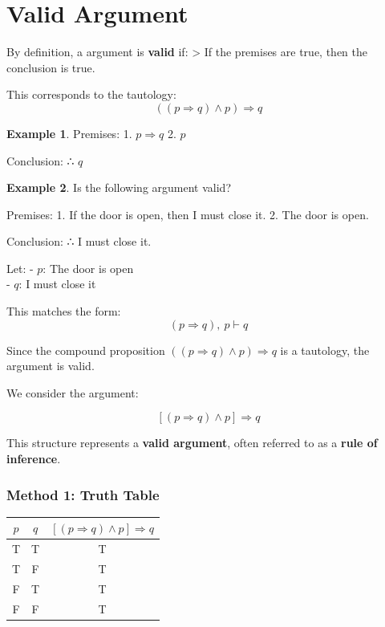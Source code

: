 \documentclass[
]{book}
\theoremstyle{definition}
\theoremstyle{definition}
\newtheorem{example}{Example}[chapter]
\theoremstyle{definition}
\theoremstyle{definition}
\theoremstyle{remark}
\begin{document}
\section{Valid Argument}\label{valid-argument}

By definition, a argument is \textbf{valid} if:
\textgreater{} If the premises are true, then the conclusion is true.

This corresponds to the tautology:
\[
((p \Rightarrow q) \land p) \Rightarrow q
\]

\begin{example}
\protect\hypertarget{exm:unnamed-chunk-58}{}\label{exm:unnamed-chunk-58}Premises:
1. \(p \Rightarrow q\)
2. \(p\)

Conclusion:
∴ \(q\)
\end{example}

\begin{example}
\protect\hypertarget{exm:unnamed-chunk-59}{}\label{exm:unnamed-chunk-59}Is the following argument valid?

Premises:
1. If the door is open, then I must close it.
2. The door is open.

Conclusion:
∴ I must close it.

Let:
- \(p\): The door is open\\
- \(q\): I must close it

This matches the form:
\[
(p \Rightarrow q),\ p \vdash q
\]

Since the compound proposition \(((p \Rightarrow q) \land p) \Rightarrow q\) is a tautology, the argument is valid.
\end{example}

We consider the argument:

\[
[(p \Rightarrow q) \land p] \Rightarrow q
\]

This structure represents a \textbf{valid argument}, often referred to as a \textbf{rule of inference}.

\subsubsection{Method 1: Truth Table}\label{method-1-truth-table}

\begin{longtable}[]{@{}ccc@{}}
\toprule\noalign{}
\(p\) & \(q\) & \([(p \Rightarrow q) \land p] \Rightarrow q\) \\
\midrule\noalign{}
\endhead
\bottomrule\noalign{}
\endlastfoot
T & T & T \\
T & F & T \\
F & T & T \\
F & F & T \\
\end{longtable}
\end{document}
